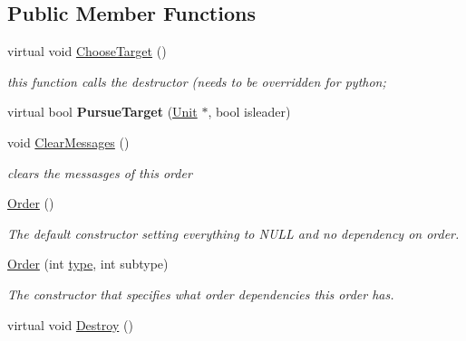 \subsection*{Public Member Functions}
\begin{DoxyCompactItemize}
\item 
virtual void \hyperlink{classOrder_abd08710d8a7cf1c550fddd4e01622fbc}{Choose\+Target} ()\hypertarget{classOrder_abd08710d8a7cf1c550fddd4e01622fbc}{}\label{classOrder_abd08710d8a7cf1c550fddd4e01622fbc}

\begin{DoxyCompactList}\small\item\em this function calls the destructor (needs to be overridden for python; \end{DoxyCompactList}\item 
virtual bool {\bfseries Pursue\+Target} (\hyperlink{classUnit}{Unit} $\ast$, bool isleader)\hypertarget{classOrder_a5e0eab34af62a89d4302ff0d0d5bdd92}{}\label{classOrder_a5e0eab34af62a89d4302ff0d0d5bdd92}

\item 
void \hyperlink{classOrder_a7a4d1d31225ccecd47ddb02b5b3c6bc1}{Clear\+Messages} ()\hypertarget{classOrder_a7a4d1d31225ccecd47ddb02b5b3c6bc1}{}\label{classOrder_a7a4d1d31225ccecd47ddb02b5b3c6bc1}

\begin{DoxyCompactList}\small\item\em clears the messasges of this order \end{DoxyCompactList}\item 
\hyperlink{classOrder_a7b6a660b03708ed5b4e1c4a6dc2a664a}{Order} ()\hypertarget{classOrder_a7b6a660b03708ed5b4e1c4a6dc2a664a}{}\label{classOrder_a7b6a660b03708ed5b4e1c4a6dc2a664a}

\begin{DoxyCompactList}\small\item\em The default constructor setting everything to N\+U\+LL and no dependency on order. \end{DoxyCompactList}\item 
\hyperlink{classOrder_a8232331d477be2b8f7d0ac0ec252c26c}{Order} (int \hyperlink{classOrder_a66fec15be8c023a4b1b0a976eeeee266}{type}, int subtype)\hypertarget{classOrder_a8232331d477be2b8f7d0ac0ec252c26c}{}\label{classOrder_a8232331d477be2b8f7d0ac0ec252c26c}

\begin{DoxyCompactList}\small\item\em The constructor that specifies what order dependencies this order has. \end{DoxyCompactList}\item 
virtual void \hyperlink{classOrder_ac8ad5611591d43e5716d4cfb34e24bbb}{Destroy} ()\hypertarget{classOrder_ac8ad5611591d43e5716d4cfb34e24bbb}{}\label{classOrder_ac8ad5611591d43e5716d4cfb34e24bbb}


\end{DoxyCompactItemize}
